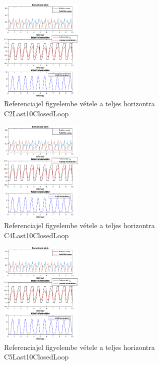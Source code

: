 \begin{figure}[H]
	\centering
	\includegraphics[width=0.35\textwidth, trim=0 0 0 0, clip,]{figures/onlab/Slope/C2Last10ClosedLoop}
	\caption{Referenciajel figyelembe vétele a teljes horizontra C2Last10ClosedLoop}
	\label{fig:onlab-refslprev3}
\end{figure}

\begin{figure}[H]
	\centering
	\includegraphics[width=0.35\textwidth, trim=0 0 0 0, clip,]{figures/onlab/Slope/C4Last10ClosedLoop}
	\caption{Referenciajel figyelembe vétele a teljes horizontra C4Last10ClosedLoop}
	\label{fig:onlab-refslprev4}
\end{figure}

\begin{figure}[H]
	\centering
	\includegraphics[width=0.35\textwidth, trim=0 0 0 0, clip,]{figures/onlab/Slope/C5Last10ClosedLoop}
	\caption{Referenciajel figyelembe vétele a teljes horizontra C5Last10ClosedLoop}
	\label{fig:onlab-refslprev5}
\end{figure}

